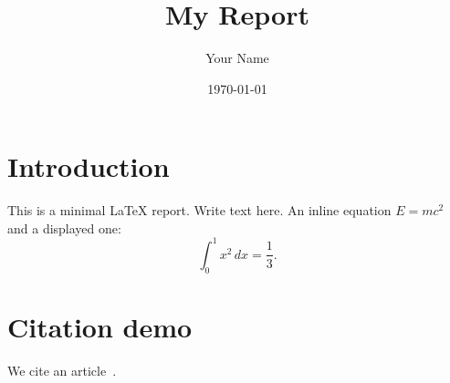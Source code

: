 \documentclass[12pt,a4paper]{article}
\title{My Report}
\author{Your Name}
\date{\today}
\begin{document}
\maketitle

\section{Introduction}
This is a minimal LaTeX report. Write text here.
An inline equation $E=mc^2$ and a displayed one:
\[
\int_0^1 x^2 \, dx = \frac{1}{3}.
\]

\section{Citation demo}
We cite an article~\cite{knuth1990}.

\printbibliography
\end{document}
